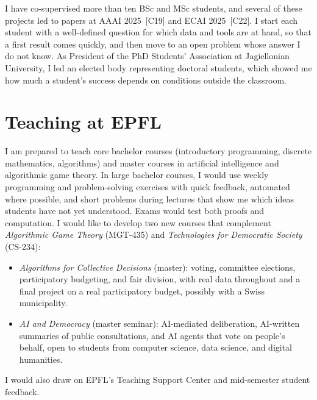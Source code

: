 \documentclass[11pt,a4paper]{article}
\newcommand{\pub}[1]{~[#1]}
\begin{document}
I have co-supervised more than ten BSc and MSc students, and several of
these projects led to papers at AAAI 2025\pub{C19} and ECAI
2025\pub{C22}.
I start each student with a well-defined question for which data and tools
are at hand, so that a first result comes quickly, and then move to an open
problem whose answer I do not know.
As President of the PhD Students' Association at Jagiellonian University, I
led an elected body representing doctoral students, which showed me how much
a student's success depends on conditions outside the classroom.

\section{Teaching at EPFL}

I am prepared to teach core bachelor courses (introductory programming,
discrete mathematics, algorithms) and master courses in artificial
intelligence and algorithmic game theory. In large bachelor courses, I would use weekly programming and problem-solving
exercises with quick feedback, automated where possible, and short problems
during lectures that show me which ideas students have not yet understood.
Exams would test both proofs and computation.
I would like to develop two new courses that complement \emph{Algorithmic
Game Theory} (MGT-435) and \emph{Technologies for Democratic Society} (CS-234):
\begin{itemize}
  \item \emph{Algorithms for Collective Decisions} (master): voting,
  committee elections, participatory budgeting, and fair division, with real data
  throughout and a final project on a real participatory budget, possibly
  with a Swiss municipality.
  \item \emph{AI and Democracy} (master seminar): AI-mediated deliberation,
  AI-written summaries of public consultations, and AI agents that vote on
  people's behalf, open to students from computer science, data science, and digital
  humanities.
\end{itemize}
I would also draw on EPFL's Teaching Support Center and mid-semester
student feedback.
\end{document}
